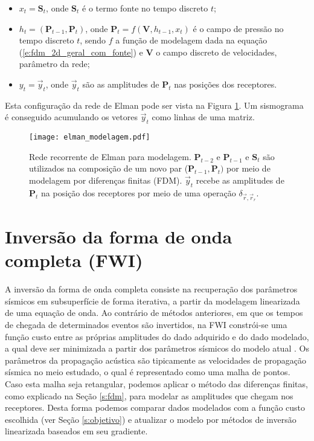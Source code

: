    \begin{itemize}
      \item $x_t = \boldsymbol{S}_{t}$, onde $\boldsymbol{S}_t$ é o termo fonte no tempo discreto $t$;
      \item $h_t = (\boldsymbol{P}_{t-1}, \boldsymbol{P}_{t})$, onde $\boldsymbol{P}_{t} = f(\boldsymbol{V},h_{t-1}, x_t)$ é o campo de pressão no tempo discreto $t$, sendo $f$ a função de modelagem dada na equação (\ref{e:fdm_2d_geral_com_fonte}) e $\boldsymbol{V}$ o campo discreto de velocidades, parâmetro da rede;
      \item $y_t = \vec{y}_t$, onde $\vec{y}_t$ são as amplitudes de $\boldsymbol{P}_{t}$ nas posições dos receptores.
    \end{itemize}

    \noindent Esta configuração da rede de Elman pode ser vista na Figura \ref{f:elman_modelagem}. Um sismograma é conseguido acumulando os vetores $\vec{y}_t$ como linhas de uma matriz.

      \begin{figure}
        \begin{center}
          \texttt{[image: elman\_modelagem.pdf]}
        \end{center}
        \caption{Rede recorrente de Elman para modelagem. $\boldsymbol{P}_{t-2}$ e $\boldsymbol{P}_{t-1}$ e $\boldsymbol{S}_t$ são utilizados na composição de um novo par ($\boldsymbol{P}_{t-1}, \boldsymbol{P}_{t})$ por meio de modelagem por diferenças finitas (FDM). $\vec{y}_t$ recebe as amplitudes de $\boldsymbol{P}_{t}$ na posição dos receptores por meio de uma operação $\delta_{\vec{r}, \vec{r}_r}$.}
        \label{f:elman_modelagem}
      \end{figure}

  \section{Inversão da forma de onda completa (FWI)}

    A inversão da forma de onda completa consiste na recuperação dos parâmetros sísmicos em subsuperfície de forma iterativa, a partir da modelagem linearizada de uma equação de onda. Ao contrário de métodos anteriores, em que os tempos de chegada de determinados eventos são invertidos, na FWI constrói-se uma função custo entre as próprias amplitudes do dado adquirido e do dado modelado, a qual deve ser minimizada a partir dos parâmetros sísmicos do modelo atual . Os parâmetros da propagação acústica são tipicamente as velocidades de propagação sísmica no meio estudado, o qual é representado como uma malha de pontos. Caso esta malha seja retangular, podemos aplicar o método das diferenças finitas, como explicado na Seção \ref{s:fdm}, para modelar as amplitudes que chegam nos receptores. Desta forma podemos comparar dados modelados com a função custo escolhida (ver Seção \ref{s:objetivo}) e atualizar o modelo por métodos de inversão linearizada baseados em seu gradiente.

